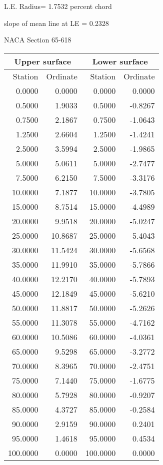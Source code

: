 \documentclass[11pt]{book}
\begin{document}
L.E. Radius=  1.7532 percent chord


 slope of mean line at LE =  0.2328
 \newpage
  \label{s65-618}
 \begin{Large}
 NACA Section 65-618
 \end{Large}
  
 \vspace{8mm}
 \begin{tabular}{|r|r|r|r|} \hline 
 \multicolumn{2}{|c|}{Upper surface} & \multicolumn{2}{|c|}{Lower surface} \\
 \hline
 Station & Ordinate & Station & Ordinate \\
 \hline
0.0000 & 0.0000 & 0.0000 & 0.0000 \\
0.5000 & 1.9033 & 0.5000 & -0.8267 \\
0.7500 & 2.1867 & 0.7500 & -1.0643 \\
1.2500 & 2.6604 & 1.2500 & -1.4241 \\
2.5000 & 3.5994 & 2.5000 & -1.9865 \\
5.0000 & 5.0611 & 5.0000 & -2.7477 \\
7.5000 & 6.2150 & 7.5000 & -3.3176 \\
10.0000 & 7.1877 & 10.0000 & -3.7805 \\
15.0000 & 8.7514 & 15.0000 & -4.4989 \\
20.0000 & 9.9518 & 20.0000 & -5.0247 \\
25.0000 & 10.8687 & 25.0000 & -5.4043 \\
30.0000 & 11.5424 & 30.0000 & -5.6568 \\
35.0000 & 11.9910 & 35.0000 & -5.7866 \\
40.0000 & 12.2170 & 40.0000 & -5.7893 \\
45.0000 & 12.1849 & 45.0000 & -5.6210 \\
50.0000 & 11.8817 & 50.0000 & -5.2626 \\
55.0000 & 11.3078 & 55.0000 & -4.7162 \\
60.0000 & 10.5086 & 60.0000 & -4.0361 \\
65.0000 & 9.5298 & 65.0000 & -3.2772 \\
70.0000 & 8.3965 & 70.0000 & -2.4751 \\
75.0000 & 7.1440 & 75.0000 & -1.6775 \\
80.0000 & 5.7928 & 80.0000 & -0.9207 \\
85.0000 & 4.3727 & 85.0000 & -0.2584 \\
90.0000 & 2.9159 & 90.0000 & 0.2401 \\
95.0000 & 1.4618 & 95.0000 & 0.4534 \\
100.0000 & 0.0000 & 100.0000 & 0.0000 \\
 \hline 
 \end{tabular}
\end{document}

